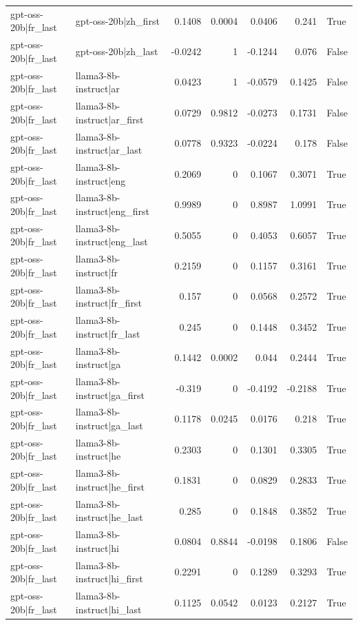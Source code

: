 \begin{table}
\begin{tabular}{l l r r r r l}
gpt-oss-20b|fr_last & gpt-oss-20b|zh_first & 0.1408 & 0.0004 & 0.0406 & 0.241 & True \\
gpt-oss-20b|fr_last & gpt-oss-20b|zh_last & -0.0242 & 1 & -0.1244 & 0.076 & False \\
gpt-oss-20b|fr_last & llama3-8b-instruct|ar & 0.0423 & 1 & -0.0579 & 0.1425 & False \\
gpt-oss-20b|fr_last & llama3-8b-instruct|ar_first & 0.0729 & 0.9812 & -0.0273 & 0.1731 & False \\
gpt-oss-20b|fr_last & llama3-8b-instruct|ar_last & 0.0778 & 0.9323 & -0.0224 & 0.178 & False \\
gpt-oss-20b|fr_last & llama3-8b-instruct|eng & 0.2069 & 0 & 0.1067 & 0.3071 & True \\
gpt-oss-20b|fr_last & llama3-8b-instruct|eng_first & 0.9989 & 0 & 0.8987 & 1.0991 & True \\
gpt-oss-20b|fr_last & llama3-8b-instruct|eng_last & 0.5055 & 0 & 0.4053 & 0.6057 & True \\
gpt-oss-20b|fr_last & llama3-8b-instruct|fr & 0.2159 & 0 & 0.1157 & 0.3161 & True \\
gpt-oss-20b|fr_last & llama3-8b-instruct|fr_first & 0.157 & 0 & 0.0568 & 0.2572 & True \\
gpt-oss-20b|fr_last & llama3-8b-instruct|fr_last & 0.245 & 0 & 0.1448 & 0.3452 & True \\
gpt-oss-20b|fr_last & llama3-8b-instruct|ga & 0.1442 & 0.0002 & 0.044 & 0.2444 & True \\
gpt-oss-20b|fr_last & llama3-8b-instruct|ga_first & -0.319 & 0 & -0.4192 & -0.2188 & True \\
gpt-oss-20b|fr_last & llama3-8b-instruct|ga_last & 0.1178 & 0.0245 & 0.0176 & 0.218 & True \\
gpt-oss-20b|fr_last & llama3-8b-instruct|he & 0.2303 & 0 & 0.1301 & 0.3305 & True \\
gpt-oss-20b|fr_last & llama3-8b-instruct|he_first & 0.1831 & 0 & 0.0829 & 0.2833 & True \\
gpt-oss-20b|fr_last & llama3-8b-instruct|he_last & 0.285 & 0 & 0.1848 & 0.3852 & True \\
gpt-oss-20b|fr_last & llama3-8b-instruct|hi & 0.0804 & 0.8844 & -0.0198 & 0.1806 & False \\
gpt-oss-20b|fr_last & llama3-8b-instruct|hi_first & 0.2291 & 0 & 0.1289 & 0.3293 & True \\
gpt-oss-20b|fr_last & llama3-8b-instruct|hi_last & 0.1125 & 0.0542 & 0.0123 & 0.2127 & True \\

\end{tabular}
\end{table}
